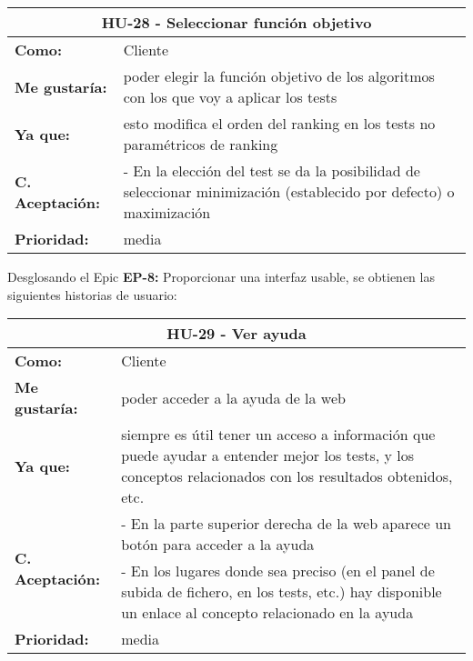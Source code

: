
\begin{table}[H]
	\begin{tabular}{| p{3cm}| p{12cm} |}
		\hline
		\multicolumn{2}{|c|}{\textbf{HU-28} - Seleccionar función objetivo} \\ \hline
		\textbf{Como:} & Cliente \\ \hline
		\textbf{Me gustaría:} & poder elegir la función objetivo de los algoritmos con los que voy a aplicar los tests \\ \hline
		\textbf{Ya que:} & esto modifica el orden del ranking en los tests no paramétricos de ranking \\ \hline
		\textbf{C. Aceptación:} & - En la elección del test se da la posibilidad de seleccionar minimización (establecido por defecto) o maximización  \\ \hline
		\textbf{\textbf{Prioridad:}} & media \\ \hline
	\end{tabular}
\end{table}


Desglosando el Epic \textbf{EP-8:} Proporcionar una interfaz usable, se obtienen las siguientes historias de usuario:

\begin{table}[H]
	\begin{tabular}{| p{3cm}| p{12cm} |}
		\hline
		\multicolumn{2}{|c|}{\textbf{HU-29} - Ver ayuda} \\ \hline
		\textbf{Como:} & Cliente \\ \hline
		\textbf{Me gustaría:} & poder acceder a la ayuda de la web \\ \hline
		\textbf{Ya que:} & siempre es útil tener un acceso a información que puede ayudar a entender mejor los tests, y los conceptos relacionados con los resultados obtenidos, etc. \\ \hline
		\multirow{2}{12cm}{\textbf{C. Aceptación:}} & - En la parte superior derecha de la web aparece un botón para acceder a la ayuda \\
		& - En los lugares donde sea preciso (en el panel de subida de fichero, en los tests, etc.) hay disponible un enlace al concepto relacionado en la ayuda \\ \hline
		\textbf{\textbf{Prioridad:}} & media \\ \hline
	\end{tabular}
\end{table}

